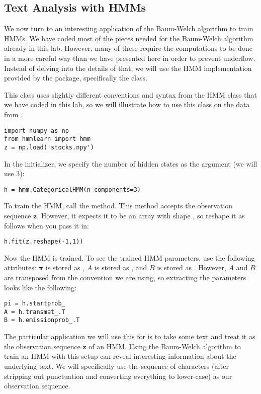 \subsection*{Text Analysis with HMMs}
We now turn to an interesting application of the Baum-Welch algorithm to train HMMs.
We have coded most of the pieces needed for the Baum-Welch algorithm already in this lab.
However, many of these require the computations to be done in a more careful way than we have presented here in order to prevent underflow.
Instead of delving into the details of that, we will use the HMM implementation provided by the  package, specifically the  class.

This class uses slightly different conventions and syntax from the HMM class that we have coded in this lab, so we will illustrate how to use this class on the data from .
\begin{lstlisting}
import numpy as np
from hmmlearn import hmm
z = np.load('stocks.npy')
\end{lstlisting}
In the initializer, we specify the number of hidden states as the  argument (we will use 3):
\begin{lstlisting}
h = hmm.CategoricalHMM(n_components=3)
\end{lstlisting}
To train the HMM, call the  method.
This method accepts the observation sequence $\mathbf{z}$.
However, it expects it to be an array with shape , so reshape it as follows when you pass it in:
\begin{lstlisting}
h.fit(z.reshape(-1,1))
\end{lstlisting}
Now the HMM is trained.
To see the trained HMM parameters, use the following attributes: 
$\boldsymbol\pi$ is stored as , $A$ is stored as , and $B$ is stored as .
However, $A$ and $B$ are transposed from the convention we are using, so extracting the parameters looks like the following:
\begin{lstlisting}
pi = h.startprob_
A = h.transmat_.T
B = h.emissionprob_.T
\end{lstlisting}

The particular application we will use this for is to take some text and treat it as the observation sequence $\mathbf{z}$ of an HMM.
Using the Baum-Welch algorithm to train an HMM with this setup can reveal interesting information about the underlying text.
We will specifically use the sequence of characters (after stripping out punctuation and converting everything to lower-case) as our observation sequence.

